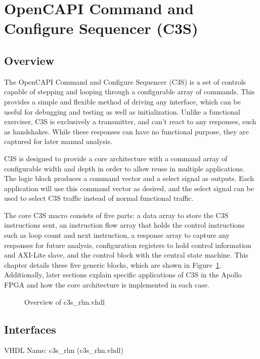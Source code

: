 \graphicspath{ {images/} }

\section{OpenCAPI Command and Configure Sequencer (C3S)} \label{section_c3s}

\subsection{Overview}
The OpenCAPI Command and Configure Sequencer (C3S) is a set of
controls capable of stepping and looping through a configurable array
of commands. This provides a simple and flexible method of driving any
interface, which can be useful for debugging and testing as well as
initialization. Unlike a functional exerciser, C3S is exclusively a
transmitter, and can't react to any responses, such as
handshakes. While these responses can have no functional purpose, they
are captured for later manual analysis.

C3S is designed to provide a core architecture with a command array of
configurable width and depth in order to allow reuse in multiple
applications. The logic block produces a command vector and a select
signal as outputs. Each application will use this command vector as
desired, and the select signal can be used to select C3S traffic
instead of normal functional traffic.

The core C3S macro consists of five parts: a data array to store the
C3S instructions sent, an instruction flow array that holds the
control instructions such as loop count and next instruction, a
response array to capture any responses for future analysis,
configuration registers to hold control information and AXI-Lite
slave, and the control block with the central state machine. This
chapter details these five generic blocks, which are shown in
Figure~\ref{fig:c3s_overview}. Additionally, later sections explain
specific applications of C3S in the Apollo FPGA and how the core
architecture is implemented in each case.

\begin{figure}[h]
  \begin{center}
    
  \end{center}
  \caption[Overview of c3s\_rlm.vhdl]{\label{fig:c3s_overview}Overview of c3s\_rlm.vhdl
  }
\end{figure}

\subsection{Interfaces}
VHDL Name: c3s\_rlm (c3s\_rlm.vhdl)

